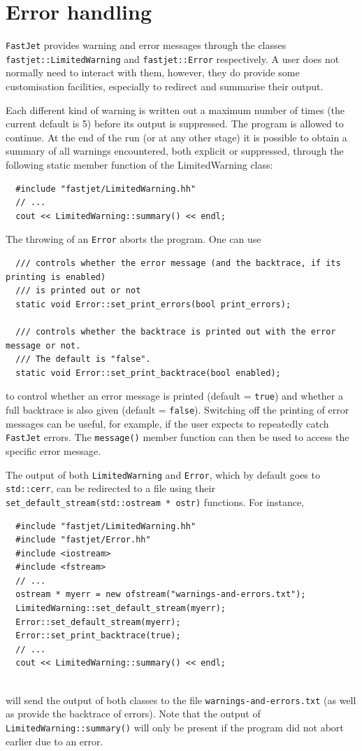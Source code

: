 \documentclass[12pt,a4]{article}
\newcommand{\fastjet}{\texttt{FastJet}\xspace}
\newcommand{\ttt}[1]{{\small\texttt{#1}}}
\begin{document}

\section{Error handling}
\label{sec:error-handling}

\fastjet provides warning and error messages through the classes
\ttt{fastjet::LimitedWarning} and \ttt{fastjet::Error} respectively.
%
A user does not normally need to interact with them,
%
however, they do provide some customisation facilities, especially to
redirect and summarise their output.

Each different kind of warning is written out a maximum number of
times (the current default is 5) before its output is suppressed. The
program is allowed to continue. 
%
At the end of the run (or at any other stage) it is possible to obtain
a summary of all warnings encountered, both explicit or suppressed,
through the following static member function of the LimitedWarning
class:
\begin{lstlisting}
  #include "fastjet/LimitedWarning.hh"
  // ...
  cout << LimitedWarning::summary() << endl;
\end{lstlisting}
The throwing of an \ttt{Error} aborts the program. One can use
\begin{lstlisting}
  /// controls whether the error message (and the backtrace, if its printing is enabled) 
  /// is printed out or not
  static void Error::set_print_errors(bool print_errors);

  /// controls whether the backtrace is printed out with the error message or not.
  /// The default is "false".
  static void Error::set_print_backtrace(bool enabled);
\end{lstlisting}
to control whether an error message is printed (default = \ttt{true})
and whether a full backtrace is also given (default = \ttt{false}).
%
Switching off the printing of error messages can be useful, for
example, if the user expects to repeatedly catch \fastjet errors.
%
The \ttt{message()} member function can then be used to access the
specific error message.

The output of both \ttt{LimitedWarning} and \ttt{Error}, which by default
goes to \ttt{std::cerr}, can be redirected to a file using their 
\ttt{set\_default\_stream(std::ostream * ostr)} functions. For instance,
\begin{lstlisting}
  #include "fastjet/LimitedWarning.hh"
  #include "fastjet/Error.hh"
  #include <iostream>
  #include <fstream>
  // ...
  ostream * myerr = new ofstream("warnings-and-errors.txt");
  LimitedWarning::set_default_stream(myerr);
  Error::set_default_stream(myerr);
  Error::set_print_backtrace(true);
  // ...
  cout << LimitedWarning::summary() << endl;
 
\end{lstlisting}
will send the output of both classes to the file
\ttt{warnings-and-errors.txt} (as well as provide the backtrace of
errors).  
%
Note that the output of \ttt{LimitedWarning::summary()} will only be
present if the program did not abort earlier due to an error.
\end{document}
